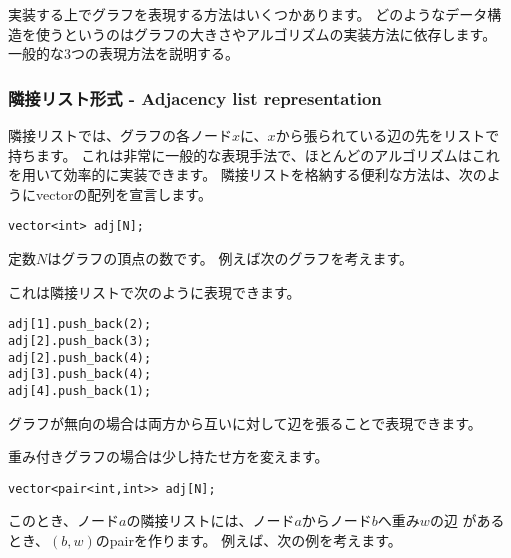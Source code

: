 実装する上でグラフを表現する方法はいくつかあります。
どのようなデータ構造を使うというのはグラフの大きさやアルゴリズムの実装方法に依存します。
一般的な3つの表現方法を説明する。

\subsubsection{隣接リスト形式 - Adjacency list representation}


隣接リストでは、グラフの各ノード$x$に、$x$から張られている辺の先をリストで持ちます。
これは非常に一般的な表現手法で、ほとんどのアルゴリズムはこれを用いて効率的に実装できます。
隣接リストを格納する便利な方法は、次のようにvectorの配列を宣言します。
\begin{lstlisting}
vector<int> adj[N];
\end{lstlisting}
定数$N$はグラフの頂点の数です。
例えば次のグラフを考えます。

\begin{center}
\end{center}
これは隣接リストで次のように表現できます。
\begin{lstlisting}
adj[1].push_back(2);
adj[2].push_back(3);
adj[2].push_back(4);
adj[3].push_back(4);
adj[4].push_back(1);
\end{lstlisting}

グラフが無向の場合は両方から互いに対して辺を張ることで表現できます。

重み付きグラフの場合は少し持たせ方を変えます。

\begin{lstlisting}
vector<pair<int,int>> adj[N];
\end{lstlisting}


このとき、ノード$a$の隣接リストには、ノード$a$からノード$b$へ重み$w$の辺
があるとき、$(b, w)$のpairを作ります。
例えば、次の例を考えます。

